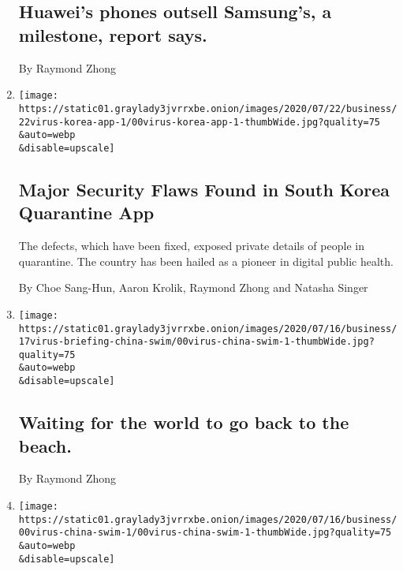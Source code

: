 \begin{enumerate}
  \hypertarget{huaweis-phones-outsell-samsungs-a-milestone-report-says}{%
  \subsection{Huawei's phones outsell Samsung's, a milestone, report
  says.}\label{huaweis-phones-outsell-samsungs-a-milestone-report-says}}

  By Raymond Zhong
\item
  \href{/2020/07/21/technology/korea-coronavirus-app-security.html}{}

  \texttt{[image: https://static01.graylady3jvrrxbe.onion/images/2020/07/22/business/22virus-korea-app-1/00virus-korea-app-1-thumbWide.jpg?quality=75\\\&auto=webp\\\&disable=upscale]}

  \hypertarget{major-security-flaws-found-in-south-korea-quarantine-app}{%
  \subsection{Major Security Flaws Found in South Korea Quarantine
  App}\label{major-security-flaws-found-in-south-korea-quarantine-app}}

  The defects, which have been fixed, exposed private details of people
  in quarantine. The country has been hailed as a pioneer in digital
  public health.

  By Choe Sang-Hun, Aaron Krolik, Raymond Zhong and Natasha Singer
\item
  \href{/live/2020/07/17/business/stock-market-today-coronavirus/waiting-for-the-world-to-go-back-to-the-beach}{}

  \texttt{[image: https://static01.graylady3jvrrxbe.onion/images/2020/07/16/business/17virus-briefing-china-swim/00virus-china-swim-1-thumbWide.jpg?quality=75\\\&auto=webp\\\&disable=upscale]}

  \hypertarget{waiting-for-the-world-to-go-back-to-the-beach}{%
  \subsection{Waiting for the world to go back to the
  beach.}\label{waiting-for-the-world-to-go-back-to-the-beach}}

  By Raymond Zhong
\item
  \href{/2020/07/17/business/china-coronavirus-swimsuits.html}{}

  \texttt{[image: https://static01.graylady3jvrrxbe.onion/images/2020/07/16/business/00virus-china-swim-1/00virus-china-swim-1-thumbWide.jpg?quality=75\\\&auto=webp\\\&disable=upscale]}


\end{enumerate}
